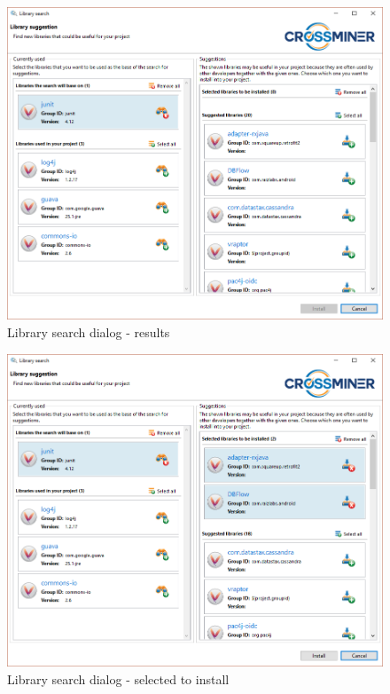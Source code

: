 \documentclass[11pt,a4paper]{book}
\begin{document}
\begin{figure}[h]
	\centering
	\includegraphics[width=\linewidth]{pic/library-search-results.png}
	\caption{Library search dialog - results}
	\label{fig:librarySearch:results}
\end{figure}

\begin{figure}[h]
\centering
\includegraphics[width=\linewidth]{pic/library-search-selected.png}
\caption{Library search dialog - selected to install}
\label{fig:librarySearch:selected}
\end{figure}
\end{document}
